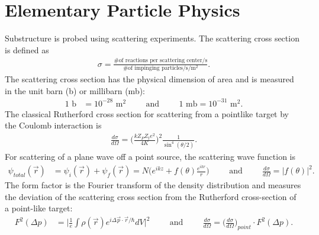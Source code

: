 \section{Elementary Particle Physics}
	Substructure is probed using scattering experiments. The scattering cross section is defined as
	\begin{align}
	\sigma = \frac{\textrm{\# of reactions per scattering center/s}}{\textrm{\# of impinging particles/s/m$^2$}}.
	\end{align}
The scattering cross section has the physical dimension of area and is measured in the unit barn (b) or millibarn (mb):
\begin{align}
1 \textrm{ b} &= 10^{-28} \textrm{ m}^2\hspace{1cm}\textrm{and}\hspace{1cm}
1 \textrm{ mb} = 10^{-31} \textrm{ m}^2.
\end{align}
The classical Rutherford cross section for scattering from a pointlike target by the Coulomb interaction is
\begin{align}
\frac{d \sigma}{d \Omega}=\bigg(\frac{kZ_PZ_te^2}{4K} \bigg)^2\frac{1}{\sin^4(\theta/2)}.
\end{align}
For scattering of a plane wave off a point source, the scattering wave function is
\begin{align}
\psi_{total}(\vec{r})&=\psi_i(\vec{r})+\psi_f(\vec{r})
=N\bigg(e^{ikz}+f(\theta)\frac{e^{ikr}}{r} \bigg) \hspace{1cm}\textrm{and}\hspace{1cm}
\frac{d \sigma}{d \Omega}=|f(\theta)|^2.
\end{align}
The form factor is the Fourier transform of the density distribution and measures the deviation of the scattering cross section from the Rutherford cross-section of a point-like target:
\begin{align}
F^2(\Delta p)&= \bigg|\frac{1}{e}\int\rho(\vec{r})e^{i\Delta \vec{p} \cdot \vec{r}/\hbar}dV\bigg|^2\hspace{1cm}\textrm{and}\hspace{1cm}
\frac{d \sigma}{d \Omega}= \bigg(\frac{d \sigma}{d \Omega} \bigg)_{point} \cdot F^2(\Delta p).
\end{align}
